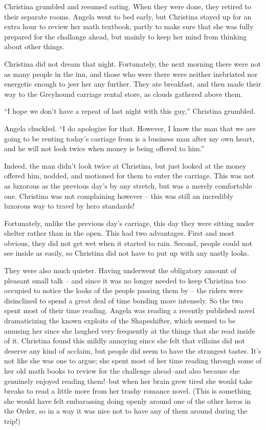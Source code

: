 \documentclass[showtrims,b6paper,draft,10pt]{memoir}
\begin{document}
Christina grumbled and resumed eating.  When they were done, they retired to their separate rooms.  Angela went to bed early, but Christina stayed up for an extra hour to review her math textbook, partly to make sure that she was fully prepared for the challange ahead, but mainly to keep her mind from thinking about other things.

\timeskip
Christina did not dream that night.  Fortunately, the next morning there were not as many people in the inn, and those who were there were neither inebriated nor energetic enough to jeer her any further.  They ate breakfast, and then made their way to the Greyhound carriage rental store, as clouds gathered above them.

``I hope we don't have a repeat of last night with this guy,'' Christina grumbled.

Angela chuckled.  ``I do apologize for that.  However, I know the man that we are going to be renting today's carriage from is a business man after my own heart, and he will not look twice when money is being offered to him.''

Indeed, the man didn't look twice at Christina, but just looked at the money offered him, nodded, and motioned for them to enter the carriage.  This was not as luxorous as the previous day's by any stretch, but was a merely comfortable one.  Christina was not complaining however -- this was still an incredibly luxorous way to travel by hero standards!

Fortunately, unlike the previous day's carriage, this day they were sitting under shelter rather than in the open.  This had two advantages.  First and most obvious, they did not get wet when it started to rain.  Second, people could not see inside as easily, so Christina did not have to put up with any nastly looks.

They were also much quieter.  Having underwent the obligatory amount of pleasant small talk -- and since it was no longer needed to keep Christina too occupied to notice the looks of the people passing them by -- the riders were disinclined to spend a great deal of time bonding more intensely.  So the two spent most of their time reading.  Angela was reading a recently published novel dramaticizing the known exploits of the Shapeshifter, which seemed to be amusing her since she laughed very frequently at the things that she read inside of it.  Christina found this mildly annoying since she felt that villains did not deserve any kind of acclaim, but people did seem to have the strangest tastes.  It's not like she was one to argue;  she spent most of her time reading through some of her old math books to review for the challenge ahead--and also because she genuinely enjoyed reading them!--but when her brain grew tired she would take breaks to read a little more from her trashy romance novel.  (This is something she would have felt embarassing doing openly around one of the other heros in the Order, so in a way it was nice not to have any of them around during the trip!)
\end{document}
